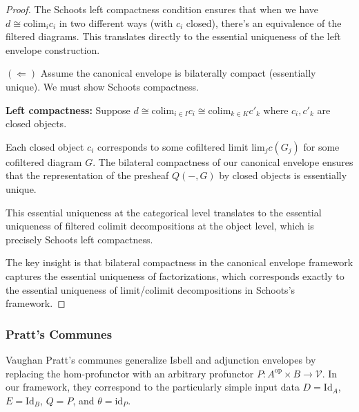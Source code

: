 \documentclass[11pt]{article}
\theoremstyle{plain}
\theoremstyle{definition}
\theoremstyle{remark}
\newcommand{\V}{\mathcal{V}}
\newcommand{\op}{\mathrm{op}}
\newcommand{\colim}{\mathrm{colim}}
\renewcommand{\lim}{\mathrm{lim}}
\begin{document}
\begin{proof}
The Schoots left compactness condition ensures that when we have $d \cong \colim_i c_i$ in two different ways (with $c_i$ closed), there's an equivalence of the filtered diagrams. This translates directly to the essential uniqueness of the left envelope construction.

$(\Leftarrow)$ Assume the canonical envelope is bilaterally compact (essentially unique). We must show Schoots compactness.

\textbf{Left compactness:} Suppose $d \cong \colim_{i \in I} c_i \cong \colim_{k \in K} c'_k$ where $c_i, c'_k$ are closed objects.

Each closed object $c_i$ corresponds to some cofiltered limit $\lim_j c(G_j)$ for some cofiltered diagram $G$. The bilateral compactness of our canonical envelope ensures that the representation of the presheaf $Q(-, G)$ by closed objects is essentially unique.

This essential uniqueness at the categorical level translates to the essential uniqueness of filtered colimit decompositions at the object level, which is precisely Schoots left compactness.

The key insight is that bilateral compactness in the canonical envelope framework captures the essential uniqueness of factorizations, which corresponds exactly to the essential uniqueness of limit/colimit decompositions in Schoots's framework.
\end{proof}

\subsubsection{Pratt's Communes}

Vaughan Pratt's communes \cite{pratt2010communes,pratt2010chu} generalize Isbell and adjunction envelopes by replacing the hom-profunctor with an arbitrary profunctor $P : A^{\op} \times B \to \V$. In our framework, they correspond to the particularly simple input data $D = \mathrm{Id}_A$, $E = \mathrm{Id}_B$, $Q = P$, and $\theta = \mathrm{id}_P$.
\end{document}
